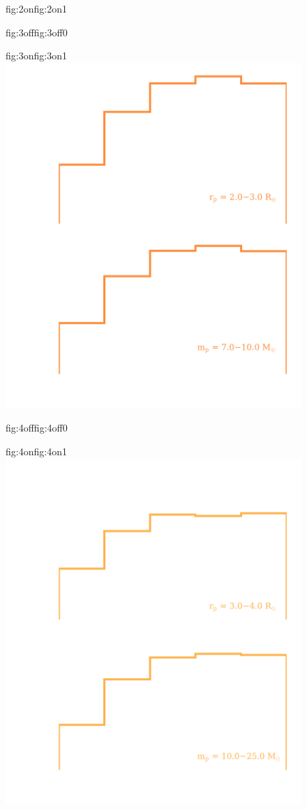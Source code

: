 \begin{figure}
\begin{ocg}{fig:2on}{fig:2on}{1}
  \end{ocg}
  \hspace{-0.8\hsize}%
    \begin{ocg}{fig:3off}{fig:3off}{0}%
  \end{ocg}%
  \begin{ocg}{fig:3on}{fig:3on}{1}%
    \includegraphics[width=0.8\hsize]{figures/mpoccurrence_3.png}%
  \end{ocg}
  \hspace{-0.8\hsize}%
    \begin{ocg}{fig:4off}{fig:4off}{0}%
  \end{ocg}%
  \begin{ocg}{fig:4on}{fig:4on}{1}%
    \includegraphics[width=0.8\hsize]{figures/mpoccurrence_4.png}%

\end{ocg}
\end{figure}
